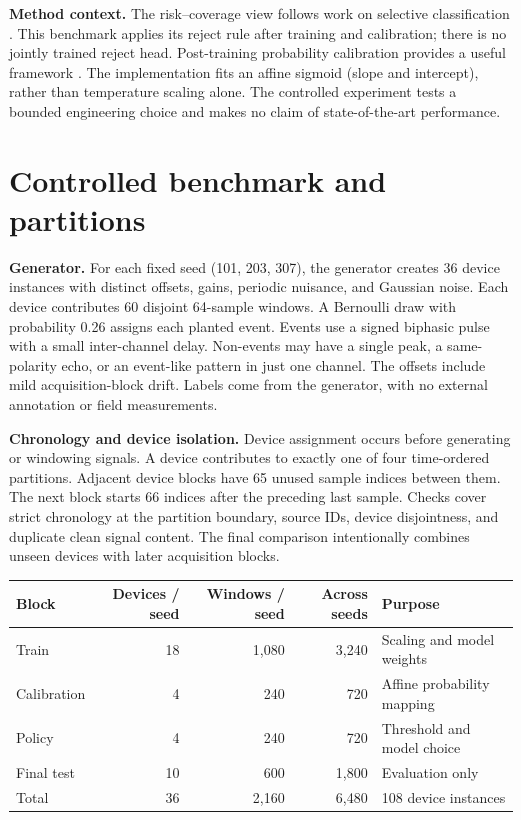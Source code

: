 \documentclass[11pt,letterpaper]{article}
\begin{document}
\textbf{Method context.} The risk--coverage view follows work on selective classification \cite{geifman2017,geifman2019}. This benchmark applies its reject rule after training and calibration; there is no jointly trained reject head. Post-training probability calibration provides a useful framework \cite{guo2017}. The implementation fits an affine sigmoid (slope and intercept), rather than temperature scaling alone. The controlled experiment tests a bounded engineering choice and makes no claim of state-of-the-art performance.

\clearpage
\section{Controlled benchmark and partitions}\label{sec:data}

\textbf{Generator.} For each fixed seed (101, 203, 307), the generator creates 36 device instances with distinct offsets, gains, periodic nuisance, and Gaussian noise. Each device contributes 60 disjoint 64-sample windows. A Bernoulli draw with probability 0.26 assigns each planted event. Events use a signed biphasic pulse with a small inter-channel delay. Non-events may have a single peak, a same-polarity echo, or an event-like pattern in just one channel. The offsets include mild acquisition-block drift. Labels come from the generator, with no external annotation or field measurements.

\textbf{Chronology and device isolation.} Device assignment occurs before generating or windowing signals. A device contributes to exactly one of four time-ordered partitions. Adjacent device blocks have 65 unused sample indices between them. The next block starts 66 indices after the preceding last sample. Checks cover strict chronology at the partition boundary, source IDs, device disjointness, and duplicate clean signal content. The final comparison intentionally combines unseen devices with later acquisition blocks.

\begin{center}
\label{tab:splits}
\begin{tabular}{@{}lrrrl@{}}
\toprule
Block & Devices / seed & Windows / seed & Across seeds & Purpose\\
\midrule
Train & 18 & 1,080 & 3,240 & Scaling and model weights\\
Calibration & 4 & 240 & 720 & Affine probability mapping\\
Policy & 4 & 240 & 720 & Threshold and model choice\\
Final test & 10 & 600 & 1,800 & Evaluation only\\
\midrule
Total & 36 & 2,160 & 6,480 & 108 device instances\\
\bottomrule
\end{tabular}
\end{center}
\end{document}
